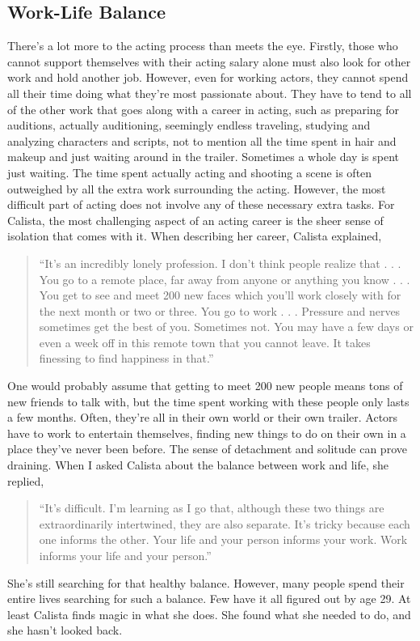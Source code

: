 \begin{multicols}{2}
\section{Work-Life Balance}
		There’s a lot more to the acting process than meets the eye. Firstly, those who cannot support themselves with their acting salary alone must also look for other work and hold another job. However, even for working actors, they cannot spend all their time doing what they’re most passionate about. They have to tend to all of the other work that goes along with a career in acting, such as preparing for auditions, actually auditioning, seemingly endless traveling, studying and analyzing characters and scripts, not to mention all the time spent in hair and makeup and just waiting around in the trailer. Sometimes a whole day is spent just waiting. The time spent actually acting and shooting a scene is often outweighed by all the extra work surrounding the acting. However, the most difficult part of acting does not involve any of these necessary extra tasks. For Calista, the most challenging aspect of an acting career is the sheer sense of isolation that comes with it. When describing her career, Calista explained,
		\begin{quote}
			“It's an incredibly lonely profession. I don't think people realize that . . . You go to a remote place, far away from anyone or anything you know . . . You get to see and meet 200 new faces which you'll work closely with for the next month or two or three. You go to work . . . Pressure and nerves sometimes get the best of you. Sometimes not. You may have a few days or even a week off in this remote town that you cannot leave. It takes finessing to find happiness in that.”
		\end{quote}
		One would probably assume that getting to meet 200 new people means tons of new friends to talk with, but the time spent working with these people only lasts a few months. Often, they’re all in their own world or their own trailer. Actors have to work to entertain themselves, finding new things to do on their own in a place they’ve never been before. The sense of detachment and solitude can prove draining. When I asked Calista about the balance between work and life, she replied,
		\begin{quote}
			“It's difficult. I'm learning as I go that, although these two things are extraordinarily intertwined, they are also separate. It's tricky because each one informs the other. Your life and your person informs your work. Work informs your life and your person.”
		\end{quote}
		She’s still searching for that healthy balance. However, many people spend their entire lives searching for such a balance. Few have it all figured out by age 29. At least Calista finds magic in what she does. She found what she needed to do, and she hasn’t looked back. 
\end{multicols}